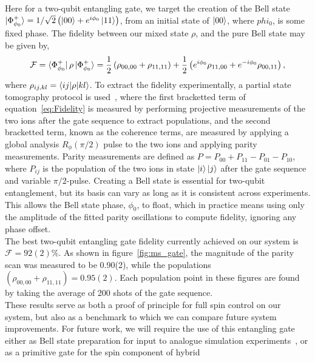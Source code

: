     Here for a two-qubit entangling gate, we target the creation of the Bell
    state $\ket{\Phi^+_{\phi_0}} = 1/\sqrt{2} \left( \ket{00} +
    e^{i\phi_0}\ket{11} \right)$, from an initial state of $\ket{00}$, where $phi_0$, is some fixed phase.
    The fidelity between our mixed state $\rho$, and the pure Bell state may be
    given by,
    \begin{equation}
        \mathcal{F} = \bra{\Phi^+_{\phi_0}} \rho \ket{\Phi^+_{\phi_0}} = \frac{1}{2} \left( \rho_{00,00} + \rho_{11,11} \right) + \frac{1}{2}\left( e^{i\phi_0}\rho_{11,00}+e^{-i\phi_0}\rho_{00,11}\right),
        \label{eq:Fidelity}
    \end{equation}
    where $\rho_{ij,kl} = \braket{ij|\rho|kl}$. To extract the fidelity experimentally, a partial state tomography 
    protocol is used~\cite{sackett2000experimental}, where the first bracketted term of
    equation~\ref{eq:Fidelity} is measured by performing projective measurements
    of the two ions after the gate sequence to extract populations, and the second bracketted term,
    known as the coherence terms, are measured by applying a global analysis
    $R_\phi(\pi/2)$ pulse to the two ions and applying parity measurements. 
    Parity measurements are defined as $P = P_{00} + P_{11} - P_{01} - P_{10}$, where $P_{ij}$ is the population of the two ions in state $\ket{i}\ket{j}$ after the gate sequence and variable $\pi/2$-pulse. 
    Creating a Bell state is essential for two-qubit entanglement, but its basis can vary as long as it is consistent across experiments. This allows the Bell state phase, $\phi_0$, to float, which in practice means using only the amplitude of the fitted parity oscillations to compute fidelity, ignoring any phase offset.\\
    The best two-qubit entangling gate fidelity currently achieved on our system is $\mathcal{F}=92(2)\%$. As shown in figure~\ref{fig:ms_gate}, the magnitude of the parity scan was measured to be 0.90(2), while the populations $\left( \rho_{00,00} + \rho_{11,11} \right) = 0.95(2)$. Each population point in these figures are found by taking the average of 200 shots of the gate sequence.\\
    These results serve as both a proof of principle for full spin control on
    our system, but also as a benchmark to which we can compare future system
    improvements.  For future work, we will require the use of this entangling
    gate either as Bell state preparation for input to analogue simulation
    experiments~\cite{bazavan2023synthetic}, or as a primitive gate for the spin component of hybrid
